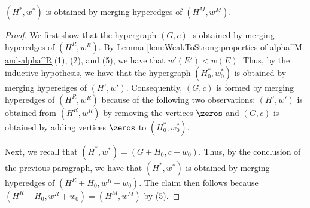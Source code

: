     \begin{claim}\label{claim:WeakToStrong:MergeProperty:H^*w^*-from-H^Mw^M}
        $(H^*, w^*)$ is obtained by merging hyperedges of $(H^M, w^M)$.
    \end{claim}
    \begin{proof}
        We first show that the hypergraph $(G, c)$ is obtained by merging hyperedges of $(H^R, w^R)$.
         By Lemma \ref{lem:WeakToStrong:properties-of-alpha^M-and-alpha^R}(1), (2), and (5), we have that $w'(E') < w(E)$. Thus, by the inductive hypothesis, we have that the hypergraph $(H_0^*, w_0^*)$ is obtained by merging hyperedges of $(H', w')$. Consequently, $(G, c)$ is formed by merging hyperedges of $(H^R, w^R)$ because of the following two observations: $(H', w')$ is obtained from $(H^R, w^R)$ by removing the vertices $\zeros$ and $(G, c)$ is obtained by adding vertices $\zeros$ to $(H_0^*, w_0^*)$.
        
        Next, we recall that $(H^*, w^*) = (G + H_0, c + w_0)$. Thus, by the conclusion of the previous paragraph, we have that $(H^*, w^*)$ is obtained by merging hyperedges of $(H^R + H_0, w^R + w_0)$. The claim then follows because $(H^R + H_0, w^R + w_0) = (H^M, w^M)$ by (5).
    \end{proof}

